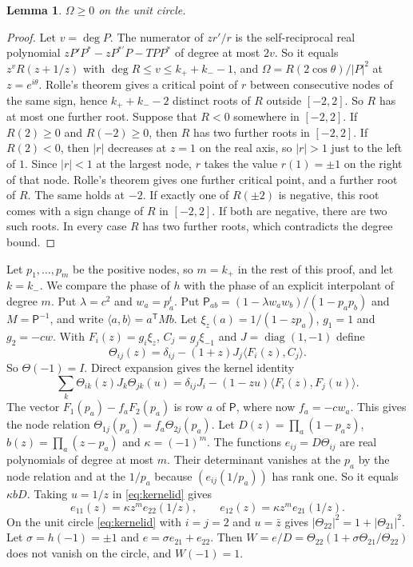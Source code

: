 \documentclass[11pt]{amsart}
\newtheorem{lemma}[theorem]{Lemma}
\theoremstyle{definition}
\theoremstyle{remark}
\numberwithin{equation}{section}
\begin{document}
\begin{lemma}\label{lem:contact}
$\Omega\ge0$ on the unit circle.
\end{lemma}

\begin{proof}
Let $v=\deg P$. The numerator of $zr'/r$ is the self-reciprocal real polynomial $zP'P^*-zP^{*\prime}P-TPP^*$ of
degree at most $2v$. So it equals $z^vR(z+1/z)$ with $\deg R\le v\le k_++k_--1$, and $\Omega=R(2\cos\theta)/|P|^2$
at $z=e^{i\theta}$. Rolle's theorem gives a critical point of $r$ between consecutive nodes of the same sign,
hence $k_++k_--2$ distinct roots of $R$ outside $[-2,2]$. So $R$ has at most one further root. Suppose that $R<0$
somewhere in $[-2,2]$. If $R(2)\ge0$ and $R(-2)\ge0$, then $R$ has two further roots in $[-2,2]$. If $R(2)<0$, then
$|r|$ decreases at $z=1$ on the real axis, so $|r|>1$ just to the left of $1$. Since $|r|<1$ at the largest node,
$r$ takes the value $r(1)=\pm1$ on the right of that node. Rolle's theorem gives one further critical point,
and a further root of $R$. The same holds at $-2$. If exactly one of $R(\pm2)$ is negative, this root comes with a sign
change of $R$ in $[-2,2]$. If both are negative, there are two such roots. In every case $R$ has two further roots,
which contradicts the degree bound.
\end{proof}

Let $p_1,\ldots,p_m$ be the positive nodes, so $m=k_+$ in the rest of this proof, and let $k=k_-$. We compare the
phase of $h$ with the phase of an explicit interpolant of degree $m$. Put $\lambda=c^2$ and $w_a=p_a^t$. Put
$\mathsf P_{ab}=(1-\lambda w_aw_b)/(1-p_ap_b)$ and $M=\mathsf P^{-1}$, and write $\langle a,b\rangle=a^{\mathsf T}Mb$. Let
$\xi_z(a)=1/(1-zp_a)$, $g_1=1$ and $g_2=-cw$. With $F_i(z)=g_i\xi_z$, $C_j=g_j\xi_{-1}$ and $J=\operatorname{diag}(1,-1)$ define
\[
 \Theta_{ij}(z)=\delta_{ij}-(1+z)J_j\langle F_i(z),C_j\rangle .
\]
So $\Theta(-1)=I$. Direct expansion gives the kernel identity
\begin{equation}\label{eq:kernelid}
 \sum_k\Theta_{ik}(z)J_k\Theta_{jk}(u)=\delta_{ij}J_i-(1-zu)\langle F_i(z),F_j(u)\rangle .
\end{equation}
The vector $F_1(p_a)-f_aF_2(p_a)$ is row $a$ of $\mathsf P$, where now $f_a=-cw_a$. This gives the node relation
$\Theta_{1j}(p_a)=f_a\Theta_{2j}(p_a)$. Let $D(z)=\prod_a(1-p_az)$, $b(z)=\prod_a(z-p_a)$ and
$\kappa=(-1)^m$. The functions $e_{ij}=D\Theta_{ij}$ are real polynomials of degree at most $m$. Their
determinant vanishes at the $p_a$ by the node relation and at the $1/p_a$ because $(e_{ij}(1/p_a))$ has rank one.
So it equals $\kappa bD$. Taking $u=1/z$ in \eqref{eq:kernelid} gives
\[
 e_{11}(z)=\kappa z^me_{22}(1/z),\qquad e_{12}(z)=\kappa z^me_{21}(1/z).
\]
On the unit circle \eqref{eq:kernelid} with $i=j=2$ and $u=\bar z$ gives $|\Theta_{22}|^2=1+|\Theta_{21}|^2$. Let
$\sigma=h(-1)=\pm1$ and $e=\sigma e_{21}+e_{22}$. Then $W=e/D=\Theta_{22}(1+\sigma\Theta_{21}/\Theta_{22})$ does not
vanish on the circle, and $W(-1)=1$.
\end{document}
